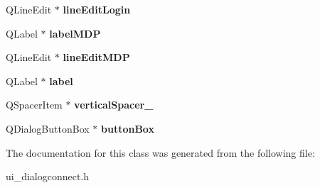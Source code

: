 \begin{DoxyCompactItemize}
\item 
\hypertarget{classUi__DialogConnect_acc81d3343049e62e88a05338390011d4}{Q\-Line\-Edit $\ast$ {\bfseries line\-Edit\-Login}}\label{classUi__DialogConnect_acc81d3343049e62e88a05338390011d4}

\item 
\hypertarget{classUi__DialogConnect_af0210dab2be54b32a15af4c2ad4f4c7f}{Q\-Label $\ast$ {\bfseries label\-M\-D\-P}}\label{classUi__DialogConnect_af0210dab2be54b32a15af4c2ad4f4c7f}

\item 
\hypertarget{classUi__DialogConnect_a08b6ee62954c7f41b985817a4f3abb8b}{Q\-Line\-Edit $\ast$ {\bfseries line\-Edit\-M\-D\-P}}\label{classUi__DialogConnect_a08b6ee62954c7f41b985817a4f3abb8b}

\item 
\hypertarget{classUi__DialogConnect_a6db9548ed4203416461eb1f4578d9bb1}{Q\-Label $\ast$ {\bfseries label}}\label{classUi__DialogConnect_a6db9548ed4203416461eb1f4578d9bb1}

\item 
\hypertarget{classUi__DialogConnect_afe148acb60e3b3454e00fe31c6934a48}{Q\-Spacer\-Item $\ast$ {\bfseries vertical\-Spacer\-\_}}\label{classUi__DialogConnect_afe148acb60e3b3454e00fe31c6934a48}

\item 
\hypertarget{classUi__DialogConnect_a69385b0310c7a60715e150ae1c3021ec}{Q\-Dialog\-Button\-Box $\ast$ {\bfseries button\-Box}}\label{classUi__DialogConnect_a69385b0310c7a60715e150ae1c3021ec}

\end{DoxyCompactItemize}


The documentation for this class was generated from the following file\-:\begin{DoxyCompactItemize}
\item 
ui\-\_\-dialogconnect.\-h\end{DoxyCompactItemize}
